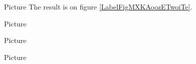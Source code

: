 Picture 
The result is on figure \ref{LabelFigMXKAoozETwoiTe}. %
\newcommand{\CaptionFigMXKAoozETwoiTe}{An histogram.}



Picture 
\begin{center}
   
\end{center}


Picture 
\begin{center}
   
\end{center}
   

Picture 
\begin{center}
   
\end{center}
   


